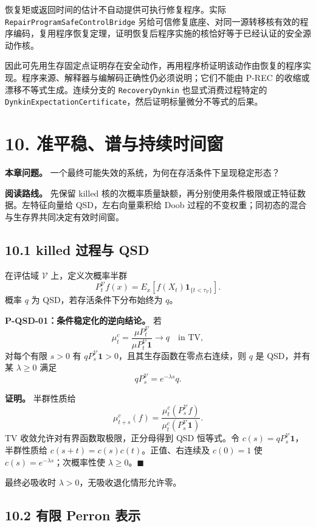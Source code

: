 \documentclass[
  11pt,
  oneside]{book}
\begin{document}
恢复矩或返回时间的估计不自动提供可执行修复程序。实际 \nolinkurl{RepairProgramSafeControlBridge} 另给可信修复底座、对同一源转移核有效的程序编码，复用程序恢复定理，证明恢复后程序实施的核恰好等于已经认证的安全源动作核。

因此可先用生存固定点证明存在安全动作，再用程序桥证明该动作由恢复的程序实现。程序来源、解释器与编解码正确性仍必须说明；它们不能由 P-REC 的收缩或漂移不等式生成。连续分支的 \nolinkurl{RecoveryDynkin} 也显式消费过程特定的 \nolinkurl{DynkinExpectationCertificate}，然后证明标量微分不等式的后果。

\chapter{10. 准平稳、谱与持续时间窗}\label{ch-10}

\textbf{本章问题。} 一个最终可能失效的系统，为何在存活条件下呈现稳定形态？

\textbf{阅读路线。} 先保留 killed 核的次概率质量缺额，再分别使用条件极限或正特征数据。左特征向量给 QSD，左右向量乘积给 Doob 过程的不变权重；同初态的混合与生存界共同决定有效时间窗。

\section{10.1 killed 过程与 QSD}\label{killed-ux8fc7ux7a0bux4e0e-qsd}

在评估域 \(\mathcal V\) 上，定义次概率半群 \[P_t^{\mathcal V}f(x)=E_x[f(X_t)\mathbf1_{\{t<\tau_{\mathcal V}\}}].\] 概率 \(q\) 为 QSD，若存活条件下分布始终为 \(q\)。

\hypertarget{p-qsd-01}{}\label{p-qsd-01}

\textbf{P-QSD-01：条件稳定化的逆向结论。} 若 \[\mu_t^c=\frac{\mu P_t^{\mathcal V}}{\mu P_t^{\mathcal V}\mathbf1}
\longrightarrow q
\quad\text{in TV},\] 对每个有限 \(s>0\) 有 \(qP_s^{\mathcal V}\mathbf1>0\)，且其生存函数在零点右连续，则 \(q\) 是 QSD，并有某 \(\lambda\ge0\) 满足 \[qP_s^{\mathcal V}=e^{-\lambda s}q.\]

\textbf{证明。} 半群性质给 \[\mu_{t+s}^c(f)=
\frac{\mu_t^c(P_s^{\mathcal V}f)}
{\mu_t^c(P_s^{\mathcal V}\mathbf1)}.\] TV 收敛允许对有界函数取极限，正分母得到 QSD 恒等式。令 \(c(s)=qP_s^{\mathcal V}\mathbf1\)，半群性质给 \(c(s+t)=c(s)c(t)\)。正值、右连续及 \(c(0)=1\) 使 \(c(s)=e^{-\lambda s}\)；次概率性使 \(\lambda\ge0\)。\(\blacksquare\)

最终必吸收时 \(\lambda>0\)，无吸收退化情形允许零。

\section{10.2 有限 Perron 表示}\label{ux6709ux9650-perron-ux8868ux793a}
\end{document}
